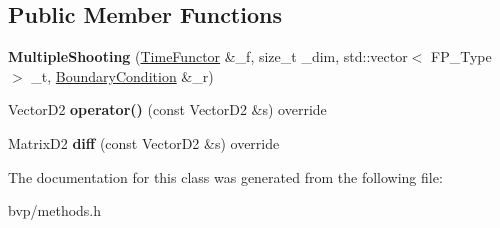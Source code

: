 \subsection*{Public Member Functions}
\begin{DoxyCompactItemize}
\item 
\mbox{\label{classMultipleShooting_a77fa6d55f0b735a87fa2f270759bc266}} 
{\bfseries Multiple\+Shooting} (\hyperlink{classTimeFunctor}{Time\+Functor} \&\+\_\+f, size\+\_\+t \+\_\+dim, std\+::vector$<$ F\+P\+\_\+\+Type $>$ \+\_\+t, \hyperlink{classBoundaryCondition}{Boundary\+Condition} \&\+\_\+r)
\item 
\mbox{\label{classMultipleShooting_a5a09e34d4555c05e9906bac0867f47a5}} 
Vector\+D2 {\bfseries operator()} (const Vector\+D2 \&s) override
\item 
\mbox{\label{classMultipleShooting_a4aacd126a40415b14b37f7187219e50c}} 
Matrix\+D2 {\bfseries diff} (const Vector\+D2 \&s) override
\end{DoxyCompactItemize}


The documentation for this class was generated from the following file\+:\begin{DoxyCompactItemize}
\item 
bvp/methods.\+h\end{DoxyCompactItemize}
